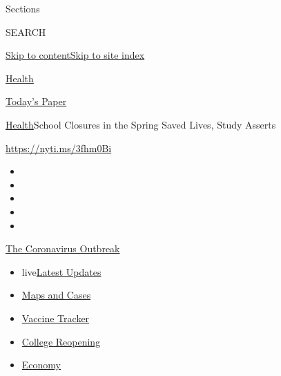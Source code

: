 Sections

SEARCH

\protect\hyperlink{site-content}{Skip to
content}\protect\hyperlink{site-index}{Skip to site index}

\href{https://www.nytimes3xbfgragh.onion/section/health}{Health}

\href{https://myaccount.nytimes3xbfgragh.onion/auth/login?response_type=cookie\&client_id=vi}{}

\href{https://www.nytimes3xbfgragh.onion/section/todayspaper}{Today's
Paper}

\href{/section/health}{Health}\textbar{}School Closures in the Spring
Saved Lives, Study Asserts

\url{https://nyti.ms/3fhm0Bi}

\begin{itemize}
\item
\item
\item
\item
\item
\end{itemize}

\href{https://www.nytimes3xbfgragh.onion/news-event/coronavirus?action=click\&pgtype=Article\&state=default\&region=TOP_BANNER\&context=storylines_menu}{The
Coronavirus Outbreak}

\begin{itemize}
\tightlist
\item
  live\href{https://www.nytimes3xbfgragh.onion/2020/08/04/world/coronavirus-covid-19.html?action=click\&pgtype=Article\&state=default\&region=TOP_BANNER\&context=storylines_menu}{Latest
  Updates}
\item
  \href{https://www.nytimes3xbfgragh.onion/interactive/2020/us/coronavirus-us-cases.html?action=click\&pgtype=Article\&state=default\&region=TOP_BANNER\&context=storylines_menu}{Maps
  and Cases}
\item
  \href{https://www.nytimes3xbfgragh.onion/interactive/2020/science/coronavirus-vaccine-tracker.html?action=click\&pgtype=Article\&state=default\&region=TOP_BANNER\&context=storylines_menu}{Vaccine
  Tracker}
\item
  \href{https://www.nytimes3xbfgragh.onion/2020/08/02/us/covid-college-reopening.html?action=click\&pgtype=Article\&state=default\&region=TOP_BANNER\&context=storylines_menu}{College
  Reopening}
\item
  \href{https://www.nytimes3xbfgragh.onion/live/2020/08/03/business/stock-market-today-coronavirus?action=click\&pgtype=Article\&state=default\&region=TOP_BANNER\&context=storylines_menu}{Economy}
\end{itemize}

